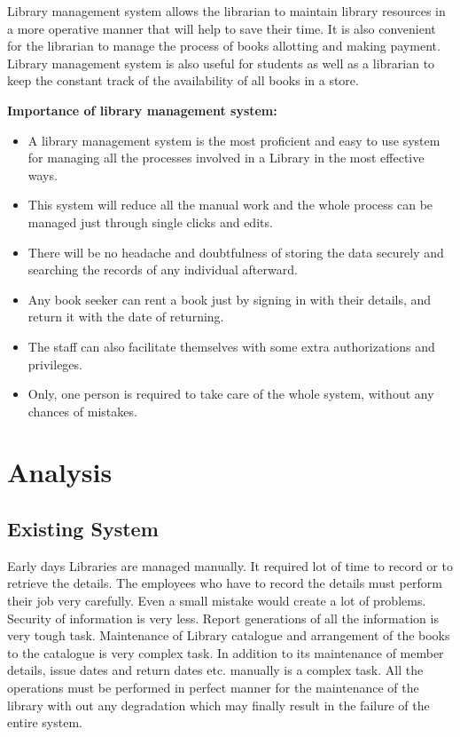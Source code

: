 \documentclass[12pt, a4paper]{report}
\begin{document}
Library management system allows the librarian to maintain library resources in a more operative manner that will help to save their time. It is also convenient for the librarian to manage the process of books allotting and making payment. Library management system is also useful for students as well as a librarian to keep the constant track of the availability of all books in a store.

\textbf{Importance of library management system:}

\begin{itemize}
	\item A library management system is the most proficient and easy to use system for managing all the processes involved in a Library in the most effective ways.
	\item This system will reduce all the manual work and the whole process can be managed just through single clicks and edits.
	\item There will be no headache and doubtfulness of storing the data securely and searching the records of any individual afterward.
	\item Any book seeker can rent a book just by signing in with their details, and return it with the date of returning.
	\item The staff can also facilitate themselves with some extra authorizations and privileges.
	\item Only, one person is required to take care of the whole system, without any chances of mistakes.
	
\end{itemize}


\chapter{Analysis}

\section{Existing System}

Early days Libraries are managed manually. It required lot of time to record or to retrieve
the details. The employees who have to record the details must perform their job very
carefully. Even a small mistake would create a lot of problems. Security of information is
very less. Report generations of all the information is very tough task.
Maintenance of Library catalogue and arrangement of the books to the catalogue is very
complex task. In addition to its maintenance of member details, issue dates and return
dates etc. manually is a complex task.
All the operations must be performed in perfect manner for the maintenance of the library
with out any degradation which may finally result in the failure of the entire system.
\end{document}
